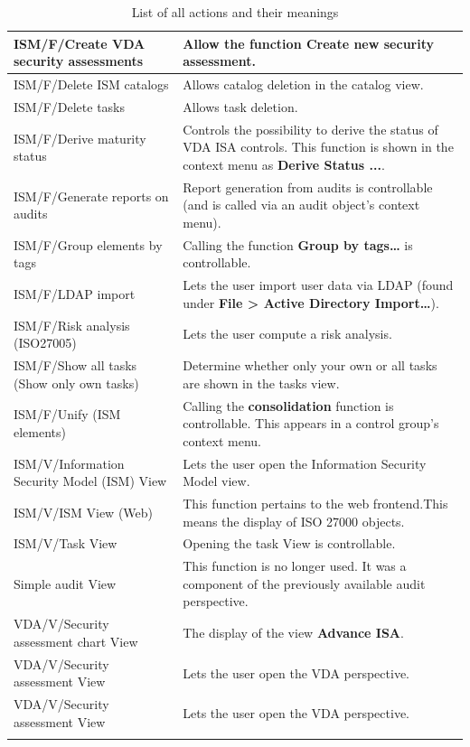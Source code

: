 \documentclass[a4paper,10pt]{book}
\begin{document}
\begin{longtable}{| p{5cm} | p{6cm} |}
\\[10pt] \hline
ISM/F/Create VDA security assessments & Allow the function \textbf{Create new
security assessment}. \\[10pt] \hline
ISM/F/Delete ISM catalogs & Allows catalog deletion in the catalog view.
\\[10pt] \hline
ISM/F/Delete tasks & Allows task deletion.  \\[10pt] \hline
ISM/F/Derive maturity status & Controls the possibility to derive the status of
VDA ISA controls. This function is shown in the context menu as  \textbf{Derive
Status ...}. \\[10pt] \hline
ISM/F/Generate reports on audits & Report generation from audits is
controllable (and is called via an audit object's context menu). \\[10pt] \hline
ISM/F/Group elements by tags & Calling the function \textbf{Group by tags…} is
controllable. \\[10pt] \hline
ISM/F/LDAP import & Lets the user import user data via LDAP (found under
\textbf{File > Active Directory Import…}). \\[10pt] \hline
ISM/F/Risk analysis (ISO27005) & Lets the user compute a risk analysis.
\\[10pt] \hline
ISM/F/Show all tasks (Show only own tasks) & Determine whether only your own or
all tasks are shown in the tasks view. \\[10pt] \hline
ISM/F/Unify (ISM elements) & Calling the \textbf{consolidation} function is
controllable. This appears in a control group's context menu. \\[10pt] \hline
ISM/V/Information Security Model (ISM) View & Lets the user open the
Information Security Model view. \\[10pt] \hline
ISM/V/ISM View (Web) & This function pertains to the web frontend.This means
the display of ISO 27000 objects. \\[10pt] \hline
ISM/V/Task View & Opening the task View is controllable.  \\[10pt] \hline
Simple audit View & This function is no longer used. It was a component of the
previously available audit perspective. \\[10pt] \hline
VDA/V/Security assessment chart View & The display of the view \textbf{Advance
ISA}. \\[10pt] \hline
VDA/V/Security assessment View & Lets the user open the VDA perspective.
\\[10pt] \hline
VDA/V/Security assessment View & Lets the user open the VDA perspective.
\\[10pt] \hline
\caption{List of all actions and their meanings}
\end{longtable}
\end{document}
